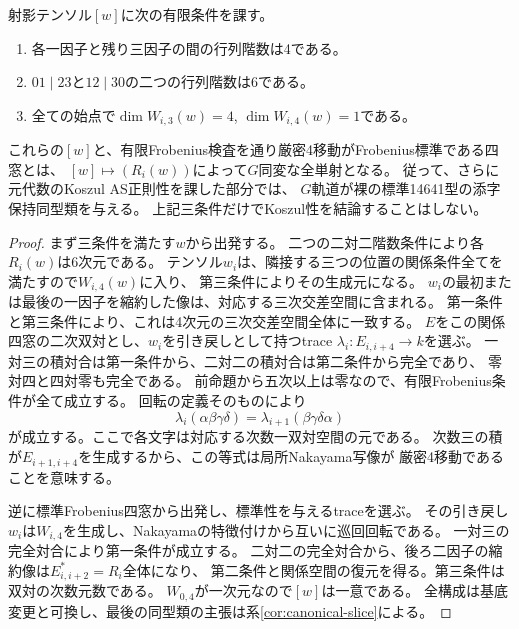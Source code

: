 \begin{theorem}[標準Frobenius四窓のテンソル復元]\label{thm:frobenius-tensor-reconstruction}
射影テンソル$[w]$に次の有限条件を課す。
\begin{enumerate}
\item 各一因子と残り三因子の間の行列階数は4である。
\item $01\mid23$と$12\mid30$の二つの行列階数は6である。
\item 全ての始点で$\dim W_{i,3}(w)=4$, $\dim W_{i,4}(w)=1$である。
\end{enumerate}
これらの$[w]$と、有限Frobenius検査を通り厳密4移動がFrobenius標準である四窓とは、
$[w]\mapsto(R_i(w))$によって$G$同変な全単射となる。
従って、さらに元代数のKoszul AS正則性を課した部分では、
$G$軌道が裸の標準14641型の添字保持同型類を与える。
上記三条件だけでKoszul性を結論することはしない。
\end{theorem}
\begin{proof}
まず三条件を満たす$w$から出発する。
二つの二対二階数条件により各$R_i(w)$は6次元である。
テンソル$w_i$は、隣接する三つの位置の関係条件全てを満たすので$W_{i,4}(w)$に入り、
第三条件によりその生成元になる。
$w_i$の最初または最後の一因子を縮約した像は、対応する三次交差空間に含まれる。
第一条件と第三条件により、これは4次元の三次交差空間全体に一致する。
$E$をこの関係四窓の二次双対とし、$w_i$を引き戻しとして持つtrace
$\lambda_i:E_{i,i+4}\to k$を選ぶ。
一対三の積対合は第一条件から、二対二の積対合は第二条件から完全であり、
零対四と四対零も完全である。
前命題から五次以上は零なので、有限Frobenius条件が全て成立する。
回転の定義そのものにより
\[
 \lambda_i(\alpha\beta\gamma\delta)
   =\lambda_{i+1}(\beta\gamma\delta\alpha)
\]
が成立する。ここで各文字は対応する次数一双対空間の元である。
次数三の積が$E_{i+1,i+4}$を生成するから、この等式は局所Nakayama写像が
厳密4移動であることを意味する。

逆に標準Frobenius四窓から出発し、標準性を与えるtraceを選ぶ。
その引き戻し$w_i$は$W_{i,4}$を生成し、Nakayamaの特徴付けから互いに巡回回転である。
一対三の完全対合により第一条件が成立する。
二対二の完全対合から、後ろ二因子の縮約像は$E_{i,i+2}^*=R_i$全体になり、
第二条件と関係空間の復元を得る。第三条件は双対の次数元数である。
$W_{0,4}$が一次元なので$[w]$は一意である。
全構成は基底変更と可換し、最後の同型類の主張は系\ref{cor:canonical-slice}による。
\end{proof}


